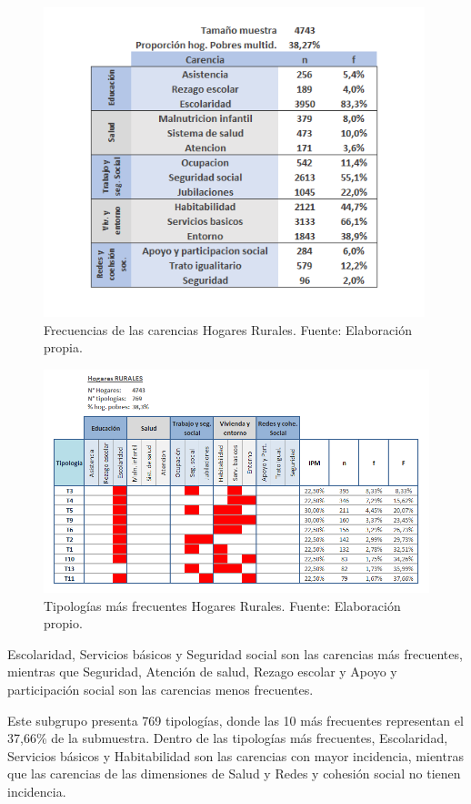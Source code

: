 \documentclass[12pt,letterpaper,spanish]{article}
\begin{document}
\begin{itemize}
    \begin{figure}[H]
        \centering
        \includegraphics[height=9cm]{HOGARES/tabla_rural.png}
        \caption{Frecuencias de las carencias Hogares Rurales. Fuente: Elaboración propia.}
        \label{freU}
    \end{figure}
    \begin{figure}[H]
        \centering
        \includegraphics[width=\textwidth]{Mati N/Rural.png}
        \caption{Tipologías más frecuentes Hogares Rurales. Fuente: Elaboración propio.}
        \label{tipR}
    \end{figure}
    Escolaridad, Servicios básicos y Seguridad social son las carencias más frecuentes, mientras que Seguridad, Atención de salud, Rezago escolar y Apoyo y participación social son las carencias menos frecuentes.
    
    Este subgrupo presenta 769 tipologías, donde las 10 más frecuentes representan el 37,66\% de la submuestra. Dentro de las tipologías más frecuentes, Escolaridad, Servicios básicos y Habitabilidad son las carencias con mayor incidencia, mientras que las carencias de las dimensiones de Salud y Redes y cohesión social no tienen incidencia. 
    
\end{itemize}
\end{document}
